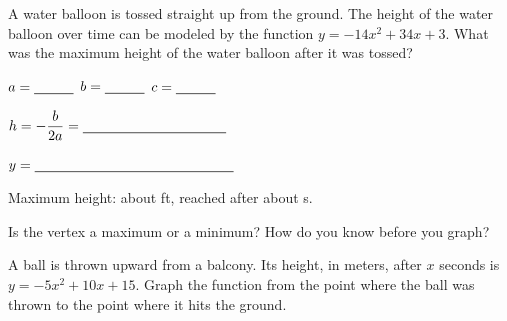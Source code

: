 A water balloon is tossed straight up from the ground. The height of the water balloon over time can be modeled by the function $y=-14x^2+34x+3$. What was the maximum height of the water balloon after it was tossed?

\begin{minipage}[t]{0.52\textwidth}
\vspace{0pt}
$a=\blank[1cm]$ \quad $b=\blank[1cm]$ \quad $c=\blank[1cm]$

\vspace{6pt}
$h=-\dfrac{b}{2a}=\blank[3.6cm]$
\lines[2]

$y=\blank[5cm]$
\lines[2]

Maximum height: about \blank[2cm] ft, reached after about \blank[1.6cm] s.
\end{minipage}\hfill
\begin{minipage}[t]{0.45\textwidth}
\vspace{0pt}
\end{minipage}

Is the vertex a maximum or a minimum? How do you know before you graph?\lines[2]

A ball is thrown upward from a balcony. Its height, in meters, after $x$ seconds is $y=-5x^2+10x+15$. Graph the function from the point where the ball was thrown to the point where it hits the ground.

